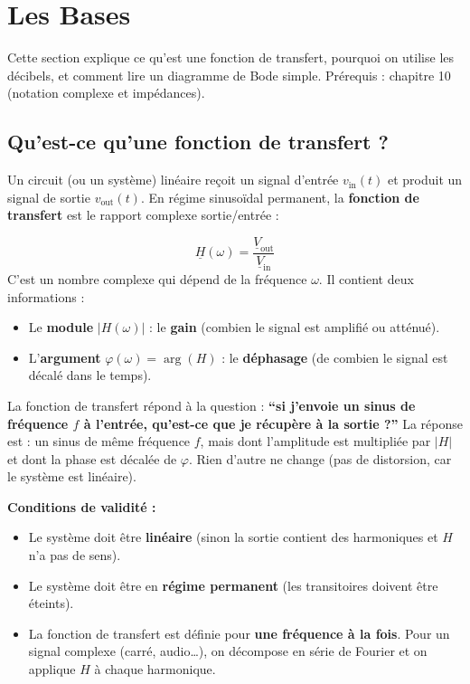 \documentclass[12pt,a4paper,twoside]{book}
\begin{document}
\section{Les Bases}

\begin{bases}
Cette section explique ce qu'est une fonction de transfert, pourquoi on utilise les décibels, et comment lire un diagramme de Bode simple. Prérequis : chapitre 10 (notation complexe et impédances).
\end{bases}

\subsection{Qu'est-ce qu'une fonction de transfert ?}

Un circuit (ou un système) linéaire reçoit un signal d'entrée $v_{\text{in}}(t)$ et produit un signal de sortie $v_{\text{out}}(t)$. En régime sinusoïdal permanent, la \textbf{fonction de transfert} est le rapport complexe sortie/entrée :

\begin{formule}
\[
\boxed{\underline{H}(\omega) = \frac{\underline{V}_{\text{out}}}{\underline{V}_{\text{in}}}}
\]
C'est un nombre complexe qui dépend de la fréquence $\omega$. Il contient deux informations :
\begin{itemize}[nosep]
\item Le \textbf{module} $|H(\omega)|$ : le \textbf{gain} (combien le signal est amplifié ou atténué).
\item L'\textbf{argument} $\varphi(\omega) = \arg(H)$ : le \textbf{déphasage} (de combien le signal est décalé dans le temps).
\end{itemize}
\end{formule}

\begin{intuition}
La fonction de transfert répond à la question : \textbf{``si j'envoie un sinus de fréquence $f$ à l'entrée, qu'est-ce que je récupère à la sortie ?''} La réponse est : un sinus de même fréquence $f$, mais dont l'amplitude est multipliée par $|H|$ et dont la phase est décalée de $\varphi$. Rien d'autre ne change (pas de distorsion, car le système est linéaire).
\end{intuition}

\begin{attention}
\textbf{Conditions de validité :}
\begin{itemize}[nosep]
\item Le système doit être \textbf{linéaire} (sinon la sortie contient des harmoniques et $H$ n'a pas de sens).
\item Le système doit être en \textbf{régime permanent} (les transitoires doivent être éteints).
\item La fonction de transfert est définie pour \textbf{une fréquence à la fois}. Pour un signal complexe (carré, audio\ldots), on décompose en série de Fourier et on applique $H$ à chaque harmonique.
\end{itemize}
\end{attention}
\end{document}
